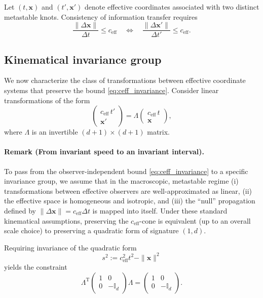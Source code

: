 \documentclass[reprint,amsmath,amssymb,aps,prl,nofootinbib,floatfix]{revtex4-2}
\begin{document}
Let $(t,\mathbf{x})$ and $(t',\mathbf{x}')$ denote effective coordinates associated with two distinct metastable knots.
Consistency of information transfer requires
\begin{equation}
\frac{\|\Delta\mathbf{x}\|}{\Delta t}
\leq
c_{\mathrm{eff}}
\quad\Longleftrightarrow\quad
\frac{\|\Delta\mathbf{x}'\|}{\Delta t'}
\leq
c_{\mathrm{eff}}.
\label{eq:ceff_invariance}
\end{equation}

\subsection{Kinematical invariance group}
We now characterize the class of transformations between effective coordinate
systems that preserve the bound \eqref{eq:ceff_invariance}.
Consider linear transformations of the form
\begin{equation}
\begin{pmatrix}
c_{\mathrm{eff}}\,t' \\
\mathbf{x}'
\end{pmatrix}
= \Lambda
\begin{pmatrix}
c_{\mathrm{eff}}\,t \\
\mathbf{x}
\end{pmatrix},
\label{eq:linear_transform}
\end{equation}
where $\Lambda$ is an invertible $(d+1)\times(d+1)$ matrix.


\paragraph{Remark (From invariant speed to an invariant interval).}
To pass from the observer-independent bound \eqref{eq:ceff_invariance} to a specific invariance group, we assume that in the macroscopic, metastable regime
(i) transformations between effective observers are well-approximated as linear,
(ii) the effective space is homogeneous and isotropic, and
(iii) the ``null'' propagation defined by $\|\Delta\mathbf{x}\|=c_{\mathrm{eff}}\Delta t$ is mapped into itself.
Under these standard kinematical assumptions, preserving the $c_{\mathrm{eff}}$-cone is equivalent (up to an overall scale choice) to preserving a quadratic form of signature $(1,d)$.

Requiring invariance of the quadratic form
\begin{equation}
s^2
:=
c_{\mathrm{eff}}^2 t^2 - \|\mathbf{x}\|^2
\label{eq:interval}
\end{equation}
yields the constraint
\begin{equation}
\Lambda^{\mathrm T}
\begin{pmatrix} 1 & 0 \\
0 & -\mathbb{I}_d \end{pmatrix}\Lambda 
= \begin{pmatrix} 1 & 0 \\
0 & -\mathbb{I}_d \end{pmatrix}.
\label{eq:lorentz_condition}
\end{equation}
\end{document}
